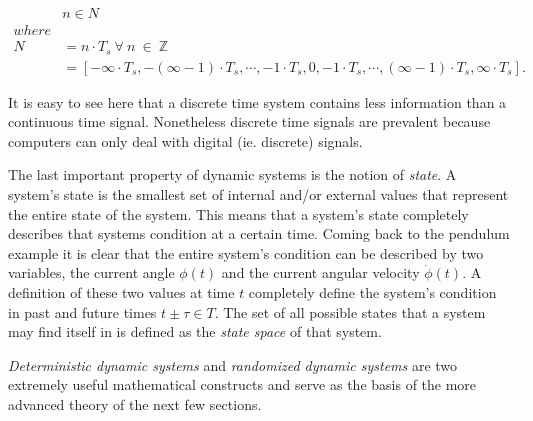 \begin{align}
&n \in N \nonumber \\
where& \nonumber \\
N &= n\cdot T_s\ \forall\ n\ \in\ \mathbb{Z} \nonumber \\
  &= [-\infty \cdot T_s,-(\infty  -1) \cdot T_s,\cdots,-1 \cdot T_s,0,-1 \cdot T_s,\cdots,(\infty-1) \cdot T_s,\infty \cdot T_s]. \nonumber
\end{align}

It is easy to see here that a discrete time system contains less information than a continuous time signal. Nonetheless discrete time signals are prevalent because computers can only deal with digital (ie. discrete) signals.

The last important property of dynamic systems is the notion of \textit{state}. A system's state is the smallest set of internal and/or external values that represent the entire state of the system. This means that a system's state completely describes that systems condition at a certain time. Coming back to the pendulum example it is clear that the entire system's condition can be described by two variables, the current angle $\phi(t)$ and the current angular velocity $\dot{\phi}(t)$. A definition of these two values at time $t$ completely define the system's condition in past and future times $t\pm\tau \in T$. The set of all possible states that a system may find itself in is defined as the \textit{state space} of that system.

\textit{Deterministic dynamic systems} and \textit{randomized dynamic systems} are two extremely useful mathematical constructs and serve as the basis of the more advanced theory of the next few sections.



